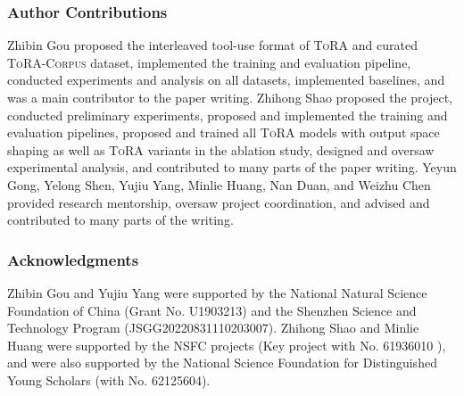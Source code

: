 \subsubsection*{Author Contributions} Zhibin Gou proposed the interleaved tool-use format of \textsc{ToRA} and curated \textsc{ToRA-Corpus} dataset, implemented the training and evaluation pipeline, conducted experiments and analysis on all datasets, implemented baselines, and was a main contributor to the paper writing. Zhihong Shao proposed the project, conducted preliminary experiments, proposed and implemented the training and evaluation pipelines, proposed and trained all \textsc{ToRA} models with output space shaping as well as \textsc{ToRA} variants in the ablation study, designed and oversaw experimental analysis, and contributed to many parts of the paper writing. Yeyun Gong, Yelong Shen, Yujiu Yang, Minlie Huang, Nan Duan, and Weizhu Chen provided research mentorship, oversaw project coordination, and advised and contributed to many parts of the writing.

\subsubsection*{Acknowledgments}
Zhibin Gou and Yujiu Yang were supported by the National Natural Science Foundation of China (Grant No. U1903213) and the Shenzhen Science and Technology Program (JSGG20220831110203007). Zhihong Shao and Minlie Huang were supported by the NSFC projects (Key project with No. 61936010 ), and were also supported by the National Science Foundation for Distinguished Young Scholars (with No. 62125604).


